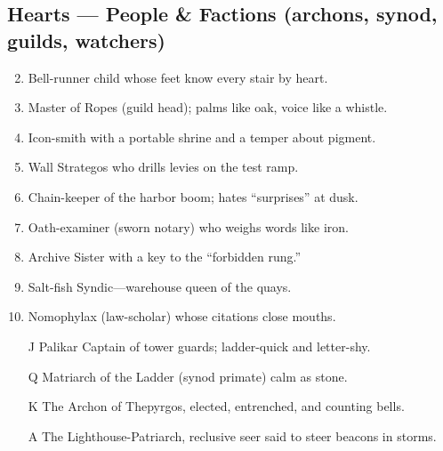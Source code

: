 \subsection*{Hearts --- People \& Factions (archons, synod, guilds, watchers)}
\label{sec:thepyrgos-people}
\begin{enumerate}
\setcounter{enumi}{1}
\item Bell-runner child whose feet know every stair by heart.
\item Master of Ropes (guild head); palms like oak, voice like a whistle.
\item Icon-smith with a portable shrine and a temper about pigment.
\item Wall Strategos who drills levies on the test ramp.
\item Chain-keeper of the harbor boom; hates ``surprises'' at dusk.
\item Oath-examiner (sworn notary) who weighs words like iron.
\item Archive Sister with a key to the ``forbidden rung.''
\item Salt-fish Syndic---warehouse queen of the quays.
\item Nomophylax (law-scholar) whose citations close mouths.
\item[J] Palikar Captain of tower guards; ladder-quick and letter-shy.
\item[Q] Matriarch of the Ladder (synod primate) calm as stone.
\item[K] The Archon of Thepyrgos, elected, entrenched, and counting bells.
\item[A] The Lighthouse-Patriarch, reclusive seer said to steer beacons in storms.
\end{enumerate}

